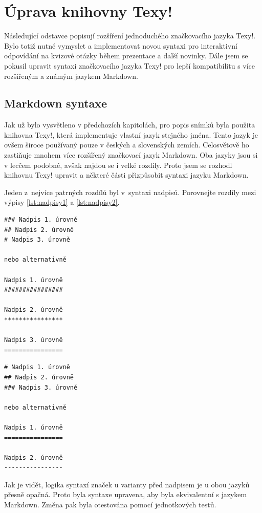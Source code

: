 \documentclass[11pt,twoside,a4paper]{book}
\begin{document}
\section{Úprava knihovny Texy!}
Následující odstavce popisují rozšíření jednoduchého značkovacího jazyka Texy!. Bylo totiž nutné vymyslet a implementovat novou syntaxi pro interaktivní odpovídání na kvizové otázky během prezentace a další novinky. Dále jsem se pokusil upravit syntaxi značkovacího jazyka Texy! pro lepší kompatibilitu s více rozšířeným a známým jazykem Markdown.

\subsection{Markdown syntaxe}
Jak už bylo vysvětleno v předchozích kapitolách, pro popis snímků byla použita knihovna Texy!, která implementuje vlastní jazyk stejného jména. Tento jazyk je ovšem široce používaný pouze v českých a slovenských zemích. Celosvětově ho zastiňuje mnohem více rozšířený značkovací jazyk Markdown. Oba jazyky jsou si v lecčem podobné, avšak najdou se i velké rozdíly. Proto jsem se rozhodl knihovnu Texy! upravit a některé části přizpůsobit syntaxi jazyku Markdown.

Jeden z~nejvíce patrných rozdílů byl v~syntaxi nadpisů. Porovnejte rozdíly mezi výpisy \ref{lst:nadpisy1} a \ref{lst:nadpisy2}.

\begin{lstlisting}[caption=Ukázka nadpisů v Texy!,label={lst:nadpisy1}]
### Nadpis 1. úrovně
## Nadpis 2. úrovně
# Nadpis 3. úrovně

nebo alternativně

Nadpis 1. úrovně
################

Nadpis 2. úrovně
****************

Nadpis 3. úrovně
================
\end{lstlisting}

\begin{lstlisting}[caption=Ukázka nadpisů v Markdown,label={lst:nadpisy2}]
# Nadpis 1. úrovně
## Nadpis 2. úrovně
### Nadpis 3. úrovně

nebo alternativně

Nadpis 1. úrovně
================

Nadpis 2. úrovně
----------------
\end{lstlisting}

Jak je vidět, logika syntaxí značek u varianty před nadpisem je u obou jazyků přesně opačná. Proto byla syntaxe upravena, aby byla ekvivalentní s jazykem Markdown. Změna pak byla otestována pomocí jednotkových testů.
\end{document}
